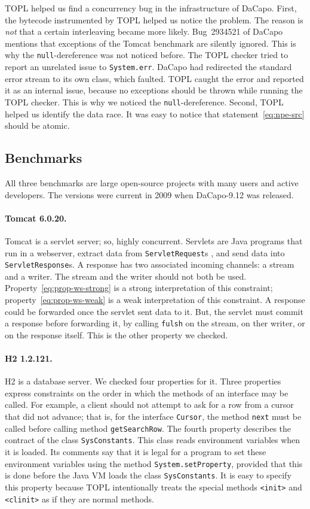 \documentclass[10pt, preprint]{sigplanconf} %
\begin{document}
TOPL helped us find a concurrency bug in the infrastructure of DaCapo.
First, the bytecode instrumented by TOPL helped us notice the problem.
The reason is \emph{not} that a certain interleaving became more likely.
Bug~2934521 of DaCapo mentions that exceptions of the Tomcat benchmark are silently ignored.
This is why the {\tt null}-dereference was not noticed before.
The TOPL checker tried to report an unrelated issue to {\tt System.err}.
DaCapo had redirected the standard error stream to its own class, which faulted.
TOPL caught the error and reported it as an internal issue, because no exceptions should be thrown while running the TOPL checker.
This is why we noticed the {\tt null}-dereference.
Second, TOPL helped us identify the data race.
It was easy to notice that statement~\eqref{eq:npe-src} should be atomic.

\subsection{Benchmarks} %

All three benchmarks are large open-source projects with many users and active developers.
The versions were current in 2009 when DaCapo-9.12 was released.

\paragraph{Tomcat 6.0.20.}
Tomcat is a servlet server; so, highly concurrent.
Servlets are Java programs that run in a webserver, extract data from {\tt ServletRequest}s , and send data into {\tt ServletResponse}s.
A response has two associated incoming channels: a stream and a writer.
The stream and the writer should not both be used.
Property~\eqref{eq:prop-ws-strong} is a strong interpretation of this constraint;
property~\eqref{eq:prop-ws-weak} is a weak interpretation of this constraint.
A response could be forwarded once the servlet sent data to it.
But, the servlet must commit a response before forwarding it, by calling {\tt fulsh} on the stream, on ther writer, or on the response itself.
This is the other property we checked.

\paragraph{H2 1.2.121.}
H2 is a database server.
We checked four properties for it.
Three properties express constraints on the order in which the methods of an interface may be called.
For example, a client should not attempt to ask for a row from a cursor that did not advance;
that is, for the interface {\tt Cursor}, the method {\tt next} must be called before calling method {\tt getSearchRow}.
The fourth property describes the contract of the class {\tt SysConstants}.
This class reads environment variables when it is loaded.
Its comments say that it is legal for a program to set these environment variables using the method {\tt System.setProperty}, provided that this is done before the Java VM loads the class {\tt SysConstants}.
It is easy to specify this property because TOPL intentionally treats the special methods {\tt <init>} and {\tt <clinit>} as if they are normal methods.
\end{document}
